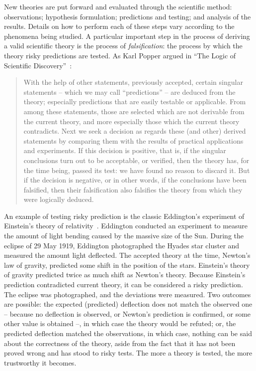 New theories are put forward and evaluated through the scientific method: observations; hypothesis formulation; predictions and testing; and analysis of the results. Details on how to perform each of these steps vary according to the phenomena being studied. A particular important step in the process of deriving a valid scientific theory is the process of \emph{falsification}: the process by which the theory risky predictions are tested. As Karl Popper argued in ``The Logic of Scientific Discovery''~\cite{popper-scientificdiscovery}:
 \begin{quote}
With the help of other statements, previously accepted, certain singular statements  --  which we may call ``predictions'' -- are deduced from the theory; especially predictions that are easily testable or applicable. From among these statements, those are selected which are not derivable from the current theory, and more especially those which the current theory contradicts. Next we seek a decision as regards these (and other) derived statements by comparing them with the results of practical applications and experiments. If this decision is positive, that is, if the singular conclusions turn out to be acceptable, or verified, then the theory has, for the time being, passed its test: we have found no reason to discard it. But if the decision is negative, or in other words, if the conclusions have been falsified, then their falsification also falsifies the theory from which they were logically deduced.
 \end{quote}
% 
An example of testing risky prediction is the classic Eddington's experiment of Einstein's theory of relativity~\cite{coles2001einstein}. Eddington conducted an experiment to measure the amount of light bending caused by the massive size of the Sun.  During the eclipse of 29 May 1919, Eddington photographed the Hyades star cluster and measured the amount light deflected. The accepted theory at the time, Newton's law of gravity, predicted some shift in the position of the stars. Einstein's theory of gravity predicted twice as much shift as Newton's theory. Because Einstein's prediction contradicted current theory, it can be considered a risky prediction.
%
The eclipse was photographed, and the deviations were measured.  Two outcomes are possible: the expected (predicted) deflection does not match the observed one -- because no deflection is observed, or Newton's prediction is confirmed, or some other value is obtained --,  in which case the theory would be refuted; or, the predicted deflection matched the observations, in which case, nothing can be said about the correctness of the theory, aside from the fact that it has not been proved wrong and has stood to risky tests. The more a theory is tested, the more trustworthy it becomes. 

